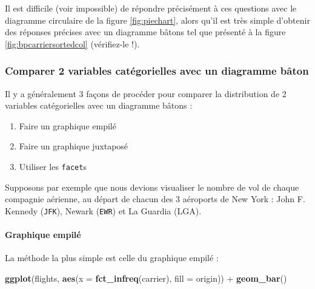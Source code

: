 \documentclass[a4paperpaper,]{article}
\newenvironment{Shaded}{\begin{snugshade}}{\end{snugshade}}
\newcommand{\DataTypeTok}[1]{\textcolor[rgb]{0.00,0.34,0.68}{#1}}
\newcommand{\KeywordTok}[1]{\textcolor[rgb]{0.12,0.11,0.11}{\textbf{#1}}}
\newcommand{\NormalTok}[1]{\textcolor[rgb]{0.12,0.11,0.11}{#1}}
\newcommand{\OperatorTok}[1]{\textcolor[rgb]{0.12,0.11,0.11}{#1}}
\newcommand{\StringTok}[1]{\textcolor[rgb]{0.75,0.01,0.01}{#1}}
\providecommand{\tightlist}{%
  \setlength{\itemsep}{0pt}\setlength{\parskip}{0pt}}
\let\oldparagraph\paragraph
\renewcommand{\paragraph}[1]{\oldparagraph{#1}\mbox{}}
\theoremstyle{definition}
\theoremstyle{definition}
\theoremstyle{definition}
\theoremstyle{remark}
\begin{document}
Il est difficile (voir impossible) de répondre précisément à ces
questions avec le diagramme circulaire de la figure \ref{fig:piechart},
alors qu'il est très simple d'obtenir des réponses précises avec un
diagramme bâtons tel que présenté à la figure
\ref{fig:bpcarriersortedcol} (vérifiez-le !).

\hypertarget{comparer-2-variables-categorielles-avec-un-diagramme-baton}{%
\subsubsection{Comparer 2 variables catégorielles avec un diagramme
bâton}\label{comparer-2-variables-categorielles-avec-un-diagramme-baton}}

Il y a généralement 3 façons de procéder pour comparer la distribution
de 2 variables catégorielles avec un diagramme bâtons :

\begin{enumerate}
\def\labelenumi{\arabic{enumi}.}
\tightlist
\item
  Faire un graphique empilé
\item
  Faire un graphique juxtaposé
\item
  Utiliser les \texttt{facet}s
\end{enumerate}

Supposons par exemple que nous devions visualiser le nombre de vol de
chaque compagnie aérienne, au départ de chacun des 3 aéroports de New
York : John F. Kennedy (\texttt{JFK}), Newark (\texttt{EWR}) et La
Guardia (LGA).

\hypertarget{graphique-empile}{%
\paragraph{Graphique empilé}\label{graphique-empile}}

La méthode la plus simple est celle du graphique empilé :

\begin{Shaded}
\begin{Highlighting}[]
\KeywordTok{ggplot}\NormalTok{(flights, }\KeywordTok{aes}\NormalTok{(}\DataTypeTok{x =} \KeywordTok{fct_infreq}\NormalTok{(carrier), }\DataTypeTok{fill =}\NormalTok{ origin)) }\OperatorTok{+}
\StringTok{  }\KeywordTok{geom_bar}\NormalTok{()}
\end{Highlighting}
\end{Shaded}
\end{document}
